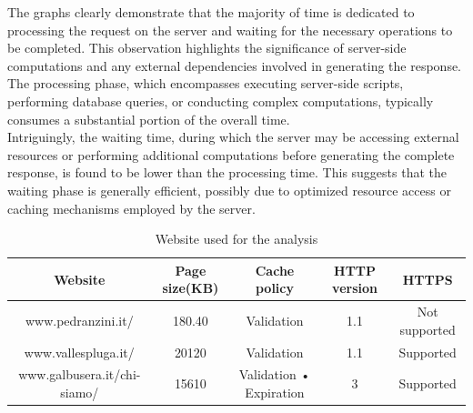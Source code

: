 \documentclass[eng]{class}
\begin{document}
The graphs clearly demonstrate that the majority of time is dedicated to processing the request on the server and waiting for the necessary operations to be completed.
This observation highlights the significance of server-side computations and any external dependencies involved in generating the response.
The processing phase, which encompasses executing server-side scripts, performing database queries,
or conducting complex computations, typically consumes a substantial portion of the overall time.\\
Intriguingly, the waiting time, during which the server may be accessing external resources or performing additional computations
before generating the complete response, is found to be lower than the processing time. This suggests that the waiting phase is generally efficient,
possibly due to optimized resource access or caching mechanisms employed by the server.
\begin{table}[H]
	\tiny
	\centering
	\begin{tabular}{|c|c|c|c|c|}
		\hline
		\linewidth=0cm
		Website                     & Page size(KB) & Cache policy            & HTTP version & HTTPS         \\
		\hline
		www.pedranzini.it/          & 180.40        & Validation              & 1.1          & Not supported \\
		www.vallespluga.it/         & 20120         & Validation              & 1.1          & Supported     \\
		www.galbusera.it/chi-siamo/ & 15610         & Validation • Expiration & 3            & Supported     \\
		\hline
	\end{tabular}
	\caption{Website used for the analysis}
	\label{tab-3}
\end{table}
\end{document}
